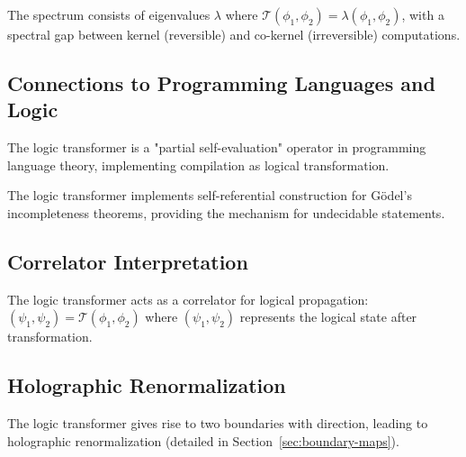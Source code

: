 \begin{definition}
\label{def:logic-spectrum}
The spectrum consists of eigenvalues $\lambda$ where $\mathcal{T}(\phi_1, \phi_2) = \lambda (\phi_1, \phi_2)$, with a spectral gap between kernel (reversible) and co-kernel (irreversible) computations.
\end{definition}

\subsection{Connections to Programming Languages and Logic}

\begin{remark}
\label{rem:partial-self-evaluation}
The logic transformer is a "partial self-evaluation" operator in programming language theory, implementing compilation as logical transformation.
\end{remark}

\begin{remark}
\label{rem:diagonal-lemma}
The logic transformer implements self-referential construction for Gödel's incompleteness theorems, providing the mechanism for undecidable statements.
\end{remark}

\subsection{Correlator Interpretation}

\begin{definition}
\label{def:logic-correlator}
The logic transformer acts as a correlator for logical propagation: $(\psi_1, \psi_2) = \mathcal{T}(\phi_1, \phi_2)$ where $(\psi_1, \psi_2)$ represents the logical state after transformation.
\end{definition}

\subsection{Holographic Renormalization}

\begin{definition}
\label{def:holographic-renorm}
The logic transformer gives rise to two boundaries with direction, leading to holographic renormalization (detailed in Section~\ref{sec:boundary-maps}).
\end{definition}

